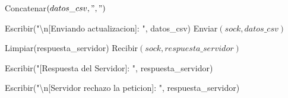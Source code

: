\begin{tcolorbox}[colback=white, colframe=azul_unam, 
title=Pseudocódigo: cliente.c, breakable]
\begin{algorithmic}[1]
            \State Concatenar$(datos\_csv, ",")$
        \EndIf

    \EndFor

    \State Escribir("\textbackslash n[Enviando actualizacion]: ", datos\_csv)
    \State Enviar$(sock, datos\_csv)$

    \State Limpiar(respuesta\_servidor)
    \State Recibir$(sock, respuesta\_servidor)$

    \State Escribir("[Respuesta del Servidor]: ", respuesta\_servidor)

\Else

    \State Escribir("\textbackslash n[Servidor rechazo la peticion]: ", respuesta\_servidor)

\EndIf

\EndProcedure

\end{algorithmic}
\end{tcolorbox}


